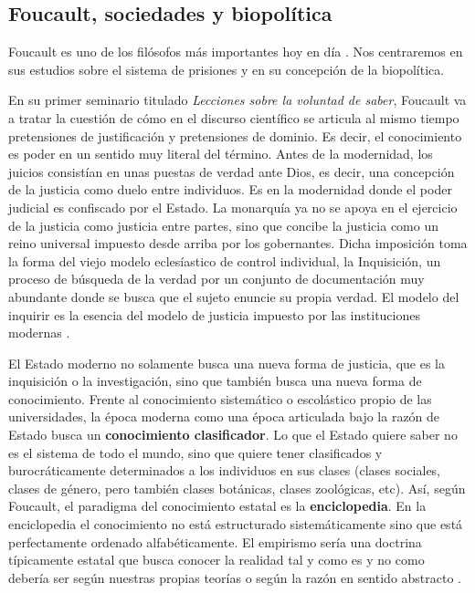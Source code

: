 \documentclass[11pt]{article}
\begin{document}
\subsection{Foucault, sociedades y biopolítica}
Foucault es uno de los filósofos más importantes hoy en día \cite{ernesto-foucault}. Nos centraremos en sus estudios sobre el sistema de prisiones y en su concepción de la biopolítica.

En su primer seminario titulado \textit{Lecciones sobre la voluntad de saber}, Foucault va a tratar la cuestión de cómo en el discurso científico se articula al mismo tiempo pretensiones de justificación y pretensiones de dominio. Es decir, el conocimiento es poder en un sentido muy literal del término. Antes de la modernidad, los juicios consistían en unas puestas de verdad ante Dios, es decir, una concepción de la justicia como duelo entre individuos. Es en la modernidad donde el poder judicial es confiscado por el Estado. La monarquía ya no se apoya en el ejercicio de la justicia como justicia entre partes, sino que concibe la justicia como un reino universal impuesto desde arriba por los gobernantes. Dicha imposición toma la forma del viejo modelo eclesíastico de control individual, la Inquisición, un proceso de búsqueda de la verdad por un conjunto de documentación muy abundante donde se busca que el sujeto enuncie su propia verdad. El modelo del inquirir es la esencia del modelo de justicia impuesto por las instituciones modernas \cite{ernesto-foucault}. 

El Estado moderno no solamente busca una nueva forma de justicia, que es la inquisición o la investigación, sino que también busca una nueva forma de conocimiento. Frente al conocimiento sistemático o escolástico propio de las universidades, la época moderna como una época articulada bajo la razón de Estado busca un \textbf{conocimiento clasificador}. Lo que el Estado quiere saber no es el sistema de todo el mundo, sino que quiere tener clasificados y burocráticamente determinados a los individuos en sus clases (clases sociales, clases de género, pero también clases botánicas, clases zoológicas, etc). Así, según Foucault, el paradigma del conocimiento estatal es la \textbf{enciclopedia}. En la enciclopedia el conocimiento no está estructurado sistemáticamente sino que está perfectamente ordenado alfabéticamente. El empirismo sería una doctrina típicamente estatal que busca conocer la realidad tal y como es y no como debería ser según nuestras propias teorías o según la razón en sentido abstracto \cite{ernesto-foucault}.
\end{document}
